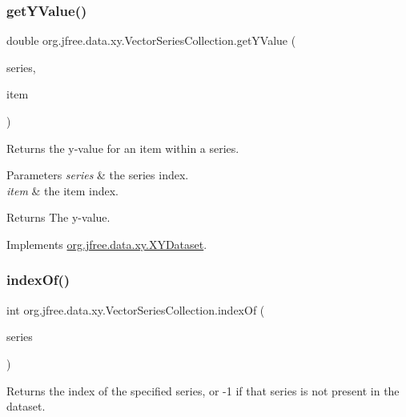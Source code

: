 \subsubsection{\texorpdfstring{get\+Y\+Value()}{getYValue()}}
{\footnotesize\ttfamily double org.\+jfree.\+data.\+xy.\+Vector\+Series\+Collection.\+get\+Y\+Value (\begin{DoxyParamCaption}\item[{int}]{series,  }\item[{int}]{item }\end{DoxyParamCaption})}

Returns the y-\/value for an item within a series.


\begin{DoxyParams}{Parameters}
{\em series} & the series index. \\
\hline
{\em item} & the item index.\\
\hline
\end{DoxyParams}
\begin{DoxyReturn}{Returns}
The y-\/value. 
\end{DoxyReturn}


Implements \mbox{\hyperlink{interfaceorg_1_1jfree_1_1data_1_1xy_1_1_x_y_dataset_a5e86389417eb5ed7b663a952ca370914}{org.\+jfree.\+data.\+xy.\+X\+Y\+Dataset}}.

\mbox{\label{classorg_1_1jfree_1_1data_1_1xy_1_1_vector_series_collection_a17de82ccda62473f83a224839c2a70ff}} 
\subsubsection{\texorpdfstring{index\+Of()}{indexOf()}}
{\footnotesize\ttfamily int org.\+jfree.\+data.\+xy.\+Vector\+Series\+Collection.\+index\+Of (\begin{DoxyParamCaption}\item[{\mbox{\hyperlink{classorg_1_1jfree_1_1data_1_1xy_1_1_vector_series}{Vector\+Series}}}]{series }\end{DoxyParamCaption})}

Returns the index of the specified series, or -\/1 if that series is not present in the dataset.


